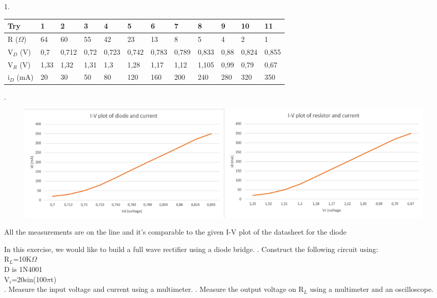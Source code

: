 {	\begin{solution}
		1.
		\begin{table}[h]
			\begin{tabular}{| l | l | l | l | l | l | l | l | l | l | l | l |}
				\hline
				Try          & 1 & 2 & 3 & 4 & 5 & 6 & 7 & 8 & 9 & 10 & 11 \\ \hline
				R (\(\Omega\))   & 64 & 60 & 55 & 42 & 23 & 13 & 8 & 5 & 4 & 2 & 1  \\ \hline
				V$_{D}$ (V)      & 0,7 & 0,712 & 0,72 & 0,723 & 0,742 & 0,783 & 0,789 & 0,833 & 0,88 & 0,824 & 0,855    \\ \hline
				V$_{R}$ (V)  & 1,33 & 1,32 & 1,31 & 1,3 & 1,28 & 1,17 & 1,12 & 1,105 & 0,99 & 0,79 & 0,67  \\ \hline
				i$_{D}$ (mA) & 20 & 30 & 50 & 80 & 120 & 160 & 200 & 240 & 280 & 320 & 350 \\ \hline
			\end{tabular}
		\end{table}
		.
		\begin{figure}[h!]
			\centering
			\includegraphics[width=1\textwidth]{images/ivlab3.png}
		\end{figure}
		All the measurements are on the line and it's comparable to the given I-V plot of the datasheet for the diode  
	\end{solution}
	\clearpage
	\begin{problem}
		In this exercise, we would like to build a full wave rectifier using a diode bridge.
		. Construct the following circuit using:\\
		R\(_{L}\)=10K\(\Omega\)\\
		D is 1N4001\\
		V\(_{i}\)=20sin(100\(\pi\)t)\\
		. Measure the input voltage and current using a multimeter.
		. Measure the output voltage on R\(_{L}\) using a multimeter and an oscilloscope.
		\newline

\end{problem}}
